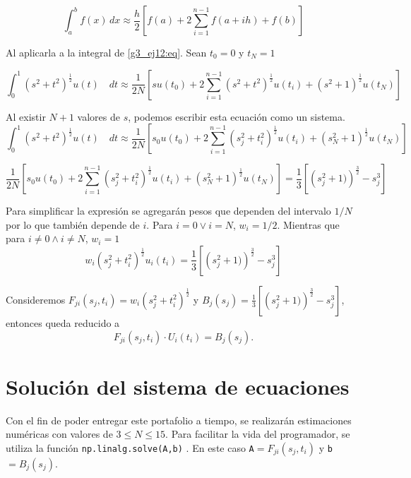 \documentclass[../portafolio.tex]{subfiles}
\begin{document}
\begin{equation}\label{g3_ej12:trapecio}
\int_a^b f(x) \, dx \approx \frac{h}{2} \left[ f(a) + 2 \sum_{i=1}^{n-1} f(a + ih) + f(b) \right]
\end{equation}

Al aplicarla a la integral de \eqref{g3_ej12:eq}. Sean $t_0=0$ y $t_N=1$

\begin{equation}\label{g3_ej12:aplic}
\int_0^1 \left(s^2+t^2\right)^{\frac{1}{2}}u(t)\quad dt \approx \frac{1}{2N} \left[ s u(t_0) + 2 \sum_{i=1}^{n-1} \left(s^2+t^2\right)^{\frac{1}{2}}u(t_i) + \left(s^2 +1\right)^{\frac{1}{2}}u(t_N) \right]
\end{equation}

Al existir $N+1$ valores de $s$, podemos escribir esta ecuación como un sistema.
\begin{equation}
\int_0^1 \left(s^2+t^2\right)^{\frac{1}{2}}u(t)\quad dt \approx \frac{1}{2N} \left[ s_0 u(t_0) + 2 \sum_{i=1}^{n-1} \left(s_j^2+t_i^2\right)^{\frac{1}{2}}u(t_i) + \left(s_{N}^2 +1\right)^{\frac{1}{2}}u(t_N) \right]
\end{equation}

\begin{equation}\label{g3_ej12:sistema}
\frac{1}{2N} \left[ s_0 u(t_0) + 2 \sum_{i=1}^{n-1} \left(s_j^2+t_i^2\right)^{\frac{1}{2}}u(t_i) + \left(s_{N}^2 +1\right)^{\frac{1}{2}}u(t_N) \right] = \frac{1}{3}[\left(s_j^2+1)\right)^{\frac{3}{2}} - s_j^3]
\end{equation}

Para simplificar la expresión se agregarán pesos que dependen del intervalo $1/N$ por lo que también depende de $i$. Para $i=0 \vee i=N$, $w_i=1/2$. Mientras que para  $i\neq 0 \wedge i\neq N$, $w_i=1$
\begin{equation}
w_i \left(s_j^2+t_i^2\right)^{\frac{1}{2}}u_i(t_i) = \frac{1}{3}[\left(s_j^2+1)\right)^{\frac{3}{2}} - s_j^3]
\end{equation}

Consideremos $F_{ji}(s_j,t_i)=w_i \left(s_j^2+t_i^2\right)^{\frac{1}{2}}$ y $B_j(s_j)=\frac{1}{3}[\left(s_j^2+1)\right)^{\frac{3}{2}} - s_j^3]$, entonces queda reducido a
\begin{equation}
F_{ji}(s_j,t_i)\cdot U_i(t_i)=B_j(s_j).
\end{equation}
\section{Solución del sistema de ecuaciones}
Con el fin de poder entregar este portafolio a tiempo, se realizarán estimaciones numéricas con valores de $3\leq N \leq 15$. Para facilitar la vida del programador, se utiliza la función \texttt{np.linalg.solve(A,b)} \citep{numpy}. En este caso \texttt{A}$=F_{ji}(s_j,t_i)$ y \texttt{b}$=B_j(s_j)$.
\end{document}
